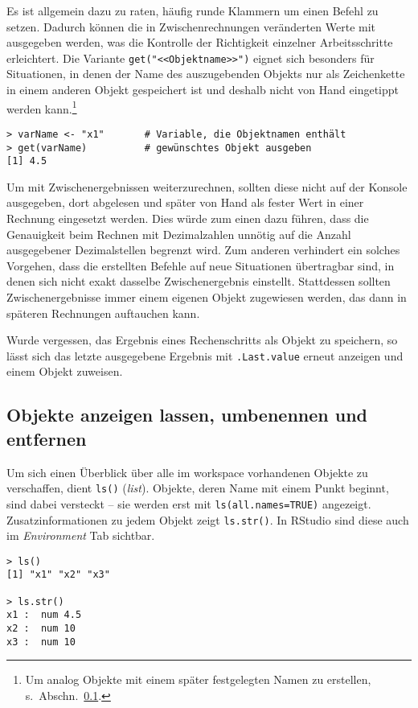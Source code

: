 Es ist allgemein dazu zu raten, häufig runde Klammern um einen Befehl zu setzen. Dadurch können die in Zwischenrechnungen veränderten Werte mit ausgegeben werden, was die Kontrolle der Richtigkeit einzelner Arbeitsschritte erleichtert. Die Variante \lstinline!get("<<Objektname>>")! eignet sich besonders für Situationen, in denen der Name des auszugebenden Objekts nur als Zeichenkette in einem anderen Objekt gespeichert ist und deshalb nicht von Hand eingetippt werden kann.\footnote{Um analog Objekte mit einem später festgelegten Namen zu erstellen, s.\ Abschn.\ \ref{sec:objRename}.}
\begin{lstlisting}
> varName <- "x1"       # Variable, die Objektnamen enthält
> get(varName)          # gewünschtes Objekt ausgeben
[1] 4.5
\end{lstlisting}

Um mit Zwischenergebnissen weiterzurechnen, sollten diese nicht auf der Konsole ausgegeben, dort abgelesen und später von Hand als fester Wert in einer Rechnung eingesetzt werden. Dies würde zum einen dazu führen, dass die Genauigkeit beim Rechnen mit Dezimalzahlen unnötig auf die Anzahl ausgegebener Dezimalstellen begrenzt wird. Zum anderen verhindert ein solches Vorgehen, dass die erstellten Befehle auf neue Situationen übertragbar sind, in denen sich nicht exakt dasselbe Zwischenergebnis einstellt. Stattdessen sollten Zwischenergebnisse immer einem eigenen Objekt zugewiesen werden, das dann in späteren Rechnungen auftauchen kann.

Wurde vergessen, das Ergebnis eines Rechenschritts als Objekt zu speichern, so lässt sich das letzte ausgegebene Ergebnis mit \lstinline!.Last.value! erneut anzeigen und einem Objekt zuweisen.

\subsection{Objekte anzeigen lassen, umbenennen und entfernen}
\label{sec:objRename}

Um sich einen Überblick über alle im workspace vorhandenen Objekte zu verschaffen, dient \lstinline!ls()! (\emph{list}). Objekte, deren Name mit einem Punkt beginnt, sind dabei versteckt -- sie werden erst mit \lstinline!ls(all.names=TRUE)! angezeigt. Zusatzinformationen zu jedem Objekt zeigt  \lstinline!ls.str()!. In RStudio sind diese auch im \emph{Environment} Tab sichtbar.
\begin{lstlisting}
> ls()
[1] "x1" "x2" "x3"

> ls.str()
x1 :  num 4.5
x2 :  num 10
x3 :  num 10
\end{lstlisting}

